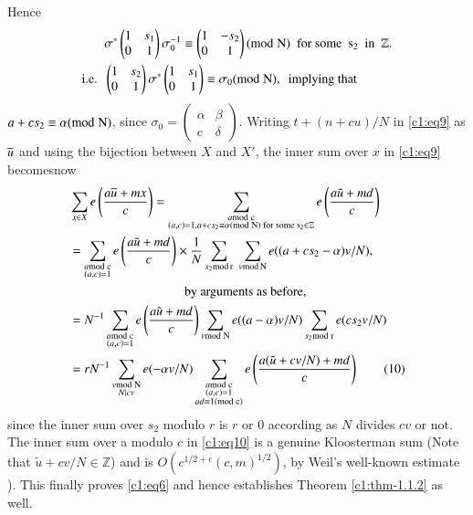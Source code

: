 Hence
\begin{align*}
& \sigma^{\ast}
\begin{pmatrix}
1 & s_{1}\\
0 & 1
\end{pmatrix}
\sigma^{-1}_{0}\equiv 
\begin{pmatrix}
1 & -s_{2}\\
0 & 1
\end{pmatrix}
(\rm{mod} \; N)\text{ \  for some \ } s_{2} \text{ \ in \ } \mathbb{Z}.\\
\text{{i.e.}\kern.3em\ } &
\begin{pmatrix}
1 & s_{2}\\
0 & 1
\end{pmatrix}
\sigma^{\ast}
\begin{pmatrix}
1 & s_{1}\\
0 & 1
\end{pmatrix}
\equiv \sigma_{0}(\rm{mod} \; N), \text{ \  implying that}
\end{align*}
$a+cs_{2}\equiv \alpha(\rm{mod} \; N)$, since
$\sigma_{0}=\left(\begin{smallmatrix} \alpha & \beta\\ c & \delta
\end{smallmatrix}\right)$. Writing $t+(n+cu)/N$ in \eqref{c1:eq9} as
$\overline{u}$ and using the bijection between $X$ and $X'$, the inner sum
over $x$ in \eqref{c1:eq9} becomes\pageoriginale now
\begin{align*}
& \sum_{x\in
    X}e\left(\frac{a\ob{u}+mx}{c}\right)=\sum_{\substack{a\rm{mod} \;
      c\\ (a,c)=1,a+cs_{2}\equiv \alpha(\rm{mod} \; N)\text{ for some }
      s_{2}\in \mathbb{Z}}}e\left(\frac{a\tilde{u}+md}{c}\right)\\
&= \sum_{\substack{a\rm{mod} \;
      c\\ (a,c)=1}}e\left(\frac{a\tilde{u}+md}{c}\right)\times
  \frac{1}{N}\sum_{s_{2}\rm{mod}\, r} \; \sum_{v\rm{mod}\,
    N}e((a+cs_{2}-\alpha)v/N),\\
&\hspace{3cm}  \text{ \ by arguments as before},\\
&= N^{-1}\sum_{\substack{a\rm{mod} \;
      c\\ (a,c)=1}}e\left(\frac{a\tilde{u}+md}{c}\right)\sum_{v\rm{mod} \;
    N}e((a-\alpha)v/N)\sum_{s_{2}\rm{mod} \; r}e(cs_{2}v/N)\\
&= rN^{-1}\sum_{\substack{v\rm{mod} \; N\\ N|cv}}e(-\alpha
  v/N)\sum_{\substack{a\rm{mod} \; c\\ (a,c)=1\\ ad\equiv 1(\rm{mod} \; c)}}e\left(\frac{a(\tilde{u}+cv/N)+md}{c}\right)\tag{10}\label{c1:eq10}
\end{align*}
since the inner sum over $s_{2}$ modulo $r$ is $r$ or $0$ according as
$N$ divides $cv$ or not. The inner sum over a modulo $c$ in
\eqref{c1:eq10} is a genuine Kloosterman sum (Note that
$\tilde{u}+cv/N\in \mathbb{Z}$) and is
$O(c^{1/2+\epsilon}(c,m)^{1/2})$, by Weil's well-known estimate
\cite{key28}). This finally proves \eqref{c1:eq6} and hence establishes
Theorem \ref{c1:thm-1.1.2} as well.



